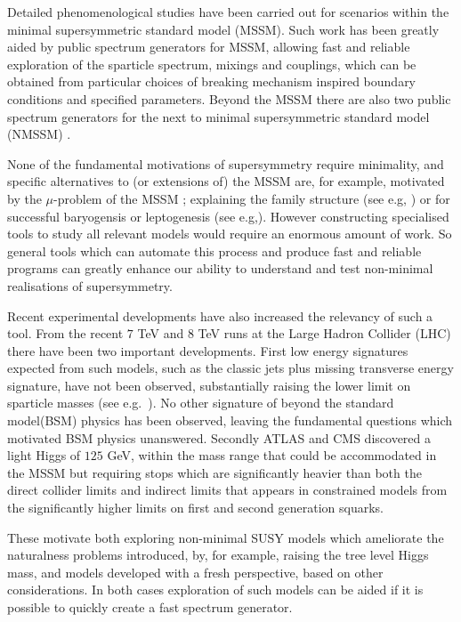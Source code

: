 \documentclass[final,3p,times,pdflatex]{elsarticle}
\begin{document}
Detailed phenomenological studies have been carried out for scenarios
within the minimal supersymmetric standard model (MSSM).  Such work
has been greatly aided by public spectrum generators for
MSSM\cite{Allanach:2001kg,Porod:2003um,Djouadi:2002ze,Baer:1993ae},
allowing fast and reliable exploration of the sparticle spectrum,
mixings and couplings, which can be obtained from particular choices
of breaking mechanism inspired boundary conditions and specified
parameters. Beyond the MSSM there are also two public spectrum
generators \cite{Ellwanger:2006rn,Allanach:2013kza} for the next to
minimal supersymmetric standard model (NMSSM) \cite{NMSSM}.

None of the fundamental motivations of supersymmetry require
minimality, and specific alternatives to (or extensions of) the MSSM
are, for example, motivated by the $\mu$-problem of the
MSSM \cite{Kim:1983dt}; explaining the family structure (see e.g,
\cite{King:2014nza}) or for successful baryogensis or leptogenesis
(see e.g,\cite{King:2008qb}). However constructing specialised tools
to study all relevant models would require an enormous amount of work.
So general tools which can automate this process and produce fast and
reliable programs can greatly enhance our ability to understand and
test non-minimal realisations of supersymmetry.

Recent experimental developments have also increased the relevancy of
such a tool. From the recent $7$ TeV and $8$ TeV runs at the Large
Hadron Collider (LHC) there have been two important developments.
First low energy signatures expected from such models, such as the
classic jets plus missing transverse energy signature, have not been
observed, substantially raising the lower limit on sparticle masses
(see e.g.~\cite{Aad:2013wta,Chatrchyan:2014lfa}). No other signature
of beyond the standard model(BSM) physics has been observed, leaving
the fundamental questions which motivated BSM physics
unanswered. Secondly ATLAS and CMS discovered\cite{ATLAS:2012ae,
  Chatrchyan:2012tx} a light Higgs of $125$ GeV, within the mass range
that could be accommodated in the MSSM but requiring stops which are
significantly heavier than both the direct collider limits and
indirect limits that appears in constrained models from the
significantly higher limits on first and second generation squarks.

These motivate both exploring non-minimal SUSY models which ameliorate
the naturalness problems introduced, by, for example, raising the tree
level Higgs mass, and models developed with a fresh perspective,
  based on other considerations.  In both cases exploration of such
  models can be aided if it is possible to quickly create a fast
  spectrum generator.
\end{document}
